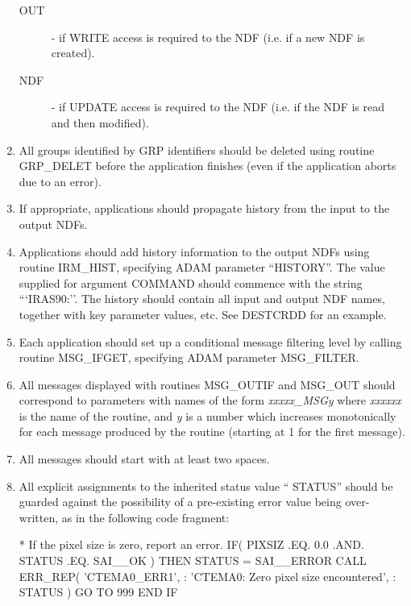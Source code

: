 \documentclass[twoside,11pt,nolof]{starlink}
\begin{document}
\begin{enumerate}
\begin{description}
\item [OUT] - if {\small WRITE} access is required to the {\small NDF} (i.e. if
a new {\small NDF} is created).

\item [NDF] - if {\small UPDATE} access is required to the {\small NDF} (i.e. if
the {\small NDF} is read and then modified).

\end{description}

\item All groups identified by {\small GRP} identifiers should be
deleted using routine {\small GRP\_DELET} before the application
finishes (even if the application aborts due to an error).

\item If appropriate, applications should propagate history from the
input to the output {\small NDF}s.

\item \label{IT:HIS} Applications should add history information to the
output {\small NDF}s using routine {\small IRM\_HIST}, specifying
{\small ADAM} parameter ``{\small HISTORY}''. The value supplied for
argument {\small COMMAND} should commence with the string ```IRAS90:''.
The history should contain all input and output {\small NDF} names,
together with key parameter values, etc. See {\small DESTCRDD} for an
example.

\item \label{IT:MSG_FILTER} Each application should set up a
conditional message filtering level by calling routine {\small
MSG\_IFGET}, specifying {\small ADAM} parameter {\small MSG\_FILTER}.

\item All messages displayed with routines {\small MSG\_OUTIF} and
{\small MSG\_OUT} should correspond to parameters with names of the
form \emph{xxxxx\_MSGy} where \emph{xxxxxx} is the name of the routine,
and \emph{y} is a number which increases monotonically for each message
produced by the routine (starting at 1 for the first message).

\item All messages should start with at least two spaces.

\item All explicit assignments to the inherited status value ``{\small
STATUS}'' should be guarded against the possibility of a pre-existing
error value being over-written, as in the following code fragment:

\small
\begin{terminalv}
*  If the pixel size is zero, report an error.
     IF( PIXSIZ .EQ. 0.0 .AND. STATUS .EQ. SAI__OK ) THEN
        STATUS = SAI__ERROR
        CALL ERR_REP( 'CTEMA0_ERR1',
    :                 'CTEMA0: Zero pixel size encountered',
    :                 STATUS )
        GO TO 999
     END IF
\end{terminalv}
\normalsize


\end{enumerate}
\end{document}
